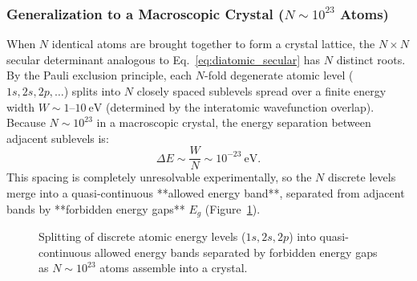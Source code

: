 \documentclass[11pt,a4paper]{article}
\begin{document}
\subsubsection{Generalization to a Macroscopic Crystal (\texorpdfstring{$N \sim 10^{23}$}{N ~ 10^23} Atoms)}
When $N$ identical atoms are brought together to form a crystal lattice, the $N\times N$ secular determinant analogous to Eq.~\eqref{eq:diatomic_secular} has $N$ distinct roots. By the Pauli exclusion principle, each $N$-fold degenerate atomic level ($1s, 2s, 2p, \dots$) splits into $N$ closely spaced sublevels spread over a finite energy width $W \sim 1\text{--}10\ \mathrm{eV}$ (determined by the interatomic wavefunction overlap). Because $N \sim 10^{23}$ in a macroscopic crystal, the energy separation between adjacent sublevels is:
\begin{equation}
    \Delta E \sim \frac{W}{N} \sim 10^{-23}\ \mathrm{eV}.
\end{equation}
This spacing is completely unresolvable experimentally, so the $N$ discrete levels merge into a quasi-continuous **allowed energy band**, separated from adjacent bands by **forbidden energy gaps** $E_g$ (Figure~\ref{fig:band_broadening_master}).

\begin{figure}[htbp]
\centering
{}
\caption{Splitting of discrete atomic energy levels ($1s, 2s, 2p$) into quasi-continuous allowed energy bands separated by forbidden energy gaps as $N \sim 10^{23}$ atoms assemble into a crystal.}
\label{fig:band_broadening_master}
\end{figure}
\end{document}
